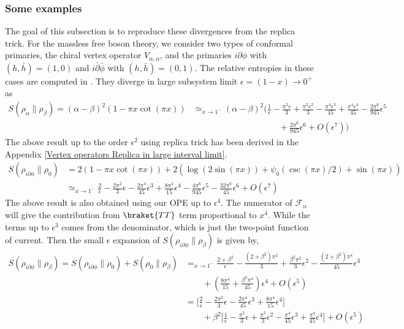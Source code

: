 \documentclass[11pt]{article}
\newcommand{\ep}{\epsilon}
\newcommand{\p}{\partial}
\newcommand{\nn}{\nonumber}
\newcommand{\lb}{\left(}
\newcommand{\rb}{\right)}
\begin{document}
\subsubsection{Some examples}
The goal of this subsection is to reproduce these divergences from the replica trick.
For the massless free boson theory, we consider two types of conformal primaries, the chiral vertex operator $V_{\alpha,\alpha}$, and the primaries $i\p \phi$ with $(h,\bar h) =  (1,0)$ and $i\bar \p \bar \phi$ with $(h,\bar h) = (0,1)$.  
The relative entropies in these cases are computed in \cite{Ruggiero_2017}. They diverge in large subsystem limit $\ep=(1-x)\to 0^+$ as
\begin{align}\label{eq: free massless boson result large x limit}
S(\rho_\alpha\|\rho_\beta)=(\alpha-\beta)^2 (1-\pi x \cot(\pi x))&\simeq_{x\to 1^-} (\alpha-\beta)^2\Bigg( \frac{1}{\ep}-\frac{\pi^2\ep}{3}+\frac{\pi^2\ep^2}{3}-\frac{\pi^4\ep^3}{45}+\frac{\pi^4\ep^4}{45}-\frac{2\pi^6}{945}\ep^5
\nn\\&\qquad\qquad\qquad\qquad\qquad+ \frac{2\pi^6}{945}\ep^6 + O(\ep^7)\Bigg)
\end{align}
The above result up to the order $\ep^2$ using replica trick has been derived in the Appendix \ref{Vertex operators Replica in large interval limit}.
\begin{align}
S(\rho_{i\partial\phi}\|\rho_0)&=2(1-\pi x \cot(\pi x))+2\lb \log(2\sin(\pi x))+\psi_0(\csc(\pi x)/2)+\sin(\pi x)\rb\\
&\simeq_{x\to 1^-} \frac{2}{\ep}-\frac{2\pi^2}{3}\ep- \frac{2\pi^4}{45}\ep^3 + \frac{8\pi^4}{15}\ep^4 -\frac{4\pi^6}{945}\ep^5 -\frac{32\pi^6}{45}\ep^6 + O(\ep^7)
\end{align}
The above result is also obtained using our OPE up to $\ep^4$.  The numerator of $\mathcal{F}_n$ will give the contribution from $\braket{TT}$ term proportional to $x^4$. While the terms up to $\ep^3$ comes from the denominator, which is just the two-point function of current. Then the small $\ep$ expansion of $S(\rho_{i\partial\phi}\|\rho_\beta)$ is given by,
\begin{align}
S(\rho_{i\partial\phi}\|\rho_\beta)=S(\rho_{i\partial\phi}\|\rho_0)+S(\rho_0\|\rho_\beta)&=_{x\to1^-}\frac{2+\beta^2}{\ep} - \frac{(2+\beta^2)\pi^2}{3} + \frac{\beta^2 \pi^2}{3}\ep^2 - \frac{(2+\beta^2)\pi^4}{45}\ep^3\nn \\
&\qquad
 + \lb \frac{8\pi^4}{15} + \frac{\beta^2\pi^4}{45}\rb\ep^4 + O(\ep^5) \\
&= \Bigg[\frac{2}{\ep} - \frac{2\pi^2}{3}\ep - \frac{2\pi^4}{45}\ep^3 + \frac{8\pi^4}{15}\ep^4\Bigg]\nn \\
&\qquad+ \beta^2 \Bigg[\frac{1}{\ep} - \frac{\pi^2}{3}\ep + \frac{\pi^2}{3}\ep^2 - \frac{\pi^4}{45}\ep^3 + \frac{\pi^4}{45}\ep^4\Bigg] + O(\ep^5)
\end{align}
\end{document}
